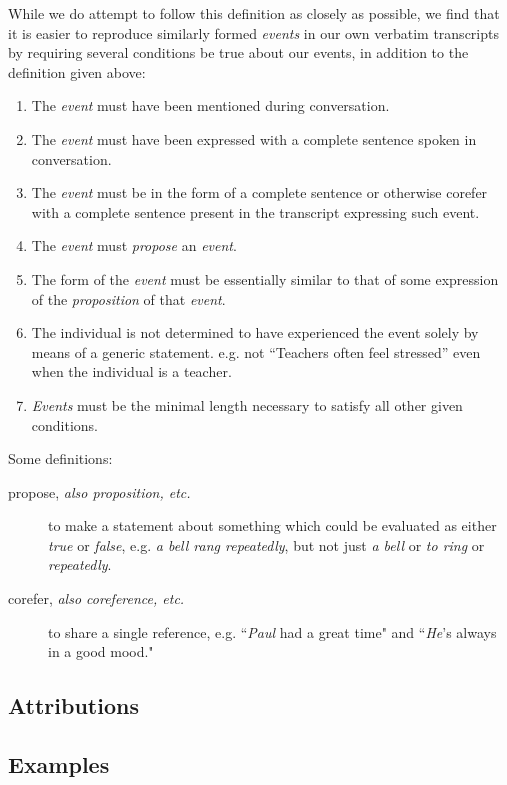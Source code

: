 \documentclass[a4paper,12pt]{article}
\begin{document}
\pagebreak
While we do attempt to follow this definition as closely as possible, we find that it is easier to reproduce similarly formed \emph{events} in our own verbatim transcripts by requiring several conditions be true about our events, in addition to the definition given above:
\begin{enumerate}
    \item The \emph{event} must have been mentioned during conversation.
    \item The \emph{event} must have been expressed with a complete sentence spoken in conversation.
    \item The \emph{event} must be in the form of a complete sentence or otherwise corefer with a complete sentence present in the transcript expressing such event.
    \item The \emph{event} must \emph{propose} an \emph{event}.
    \item The form of the \emph{event} must be essentially similar to that of some expression of the \emph{proposition} of that \emph{event}. %
    \item The individual is not determined to have experienced the event solely by means of a generic statement. e.g. not ``Teachers often feel stressed'' even when the individual is a teacher.
    \item \emph{Events} must be the minimal length necessary to satisfy all other given conditions.
\end{enumerate}
Some definitions:
\begin{description}
    \item[propose, \emph{also \emph{proposition}, etc.}] to make a statement about something which could be evaluated as either \emph{true} or \emph{false},
        e.g. \emph{a bell rang repeatedly}, but not just \emph{a bell} or \emph{to ring} or \emph{repeatedly}.
    \item[corefer, \emph{also \emph{coreference}, etc.}] to share a single reference,
        e.g. ``\emph{Paul} had a great time" and ``\emph{He}'s always in a good mood."
\end{description}

\pagebreak
\subsection{Attributions}
\subsection{Examples}
\end{document}
